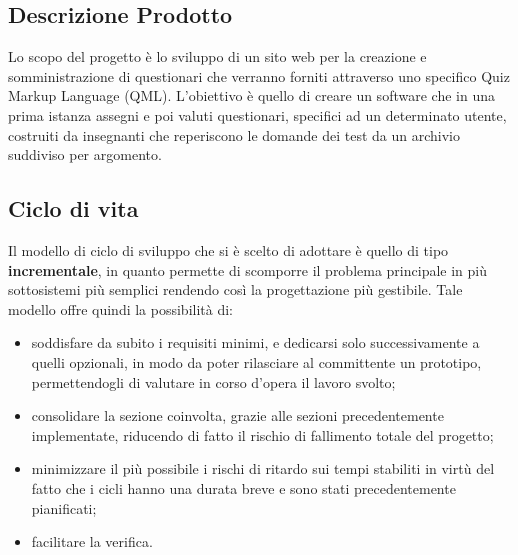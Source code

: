 \documentclass[12pt,a4paper]{article}
\begin{document}
\subsection{Descrizione Prodotto}
Lo scopo del progetto è lo sviluppo di un sito web per la creazione e somministrazione di questionari che verranno forniti attraverso uno specifico Quiz Markup Language (QML). L'obiettivo è quello di creare un software che in una prima istanza assegni e poi valuti questionari, specifici ad un determinato utente, costruiti da insegnanti che reperiscono le domande dei test da un archivio suddiviso per argomento.

\subsection{Ciclo di vita}
Il modello di ciclo di sviluppo che si è scelto di adottare è quello di tipo \textbf{incrementale}, in quanto permette di scomporre il problema principale in più sottosistemi più semplici rendendo così la progettazione più gestibile. Tale modello offre quindi la possibilità di:
\begin{itemize}
	\item soddisfare da subito i requisiti minimi, e dedicarsi solo successivamente a quelli opzionali, in modo da poter rilasciare al committente un prototipo, permettendogli di valutare in corso d'opera il lavoro svolto;
	\item consolidare la sezione coinvolta, grazie alle sezioni precedentemente implementate, riducendo di fatto il rischio di fallimento totale del progetto;
	\item minimizzare il più possibile i rischi di ritardo sui tempi stabiliti in virtù del fatto che i cicli hanno una durata breve e sono stati precedentemente pianificati;
	\item facilitare la verifica.
\end{itemize}
\end{document}
